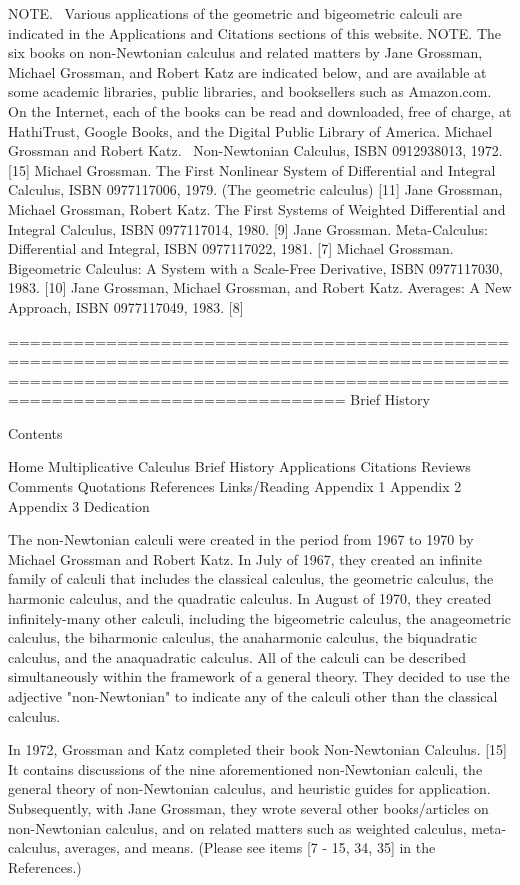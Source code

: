 \documentclass[12pt]{article}
\begin{document}
NOTE.  Various applications of the geometric and bigeometric calculi are indicated in the Applications and Citations sections of this website. 
NOTE. The six books on non-Newtonian calculus and related matters by Jane Grossman, Michael Grossman, and Robert Katz are indicated below, and are available at some academic libraries, public libraries, and booksellers such as Amazon.com. On the Internet, each of the books can be read and downloaded, free of charge, at HathiTrust, Google Books, and the Digital Public Library of America.
Michael Grossman and Robert Katz.  Non-Newtonian Calculus, ISBN 0912938013, 1972.  [15] 
Michael Grossman. The First Nonlinear System of Differential and Integral Calculus, ISBN 0977117006, 1979. (The geometric calculus) [11] 
Jane Grossman, Michael Grossman, Robert Katz. The First Systems of Weighted Differential and Integral Calculus, ISBN 0977117014, 1980. [9]
Jane Grossman. Meta-Calculus: Differential and Integral, ISBN 0977117022, 1981. [7]
Michael Grossman. Bigeometric Calculus: A System with a Scale-Free Derivative, ISBN 0977117030, 1983. [10]
Jane Grossman, Michael Grossman, and Robert Katz. Averages: A New Approach, ISBN 0977117049, 1983. [8] 

=========================================================================================================================================================================
Brief History


Contents

Home
Multiplicative Calculus
Brief History
Applications
Citations
Reviews
Comments
Quotations
References
Links/Reading
Appendix 1
Appendix 2
Appendix 3
Dedication


The non-Newtonian calculi were created in the period from 1967 to 1970 by Michael Grossman and Robert Katz. In July of 1967, they created an infinite family of calculi that includes the classical calculus, the geometric calculus, the harmonic calculus, and the quadratic calculus. In August of 1970, they created infinitely-many other calculi, including the bigeometric calculus, the anageometric calculus, the biharmonic calculus, the anaharmonic calculus, the biquadratic calculus, and the anaquadratic calculus. All of the calculi can be described simultaneously within the framework of a general theory. They decided to use the adjective "non-Newtonian" to indicate any of the calculi other than the classical calculus.

In 1972, Grossman and Katz completed their book Non-Newtonian Calculus. [15]  It contains discussions of the nine aforementioned non-Newtonian calculi, the general theory of non-Newtonian calculus, and heuristic guides for application. Subsequently, with Jane Grossman, they wrote several other books/articles on non-Newtonian calculus, and on related matters such as weighted calculus, meta-calculus, averages, and means. (Please see items [7 - 15, 34, 35] in the References.)
\end{document}
